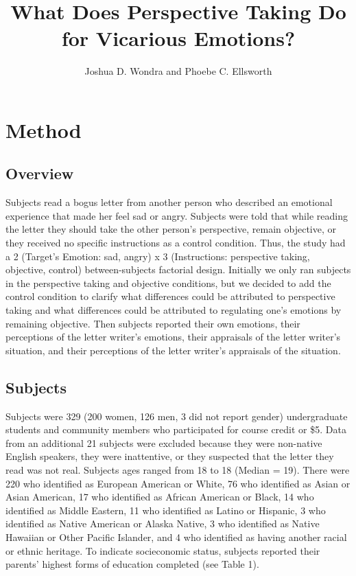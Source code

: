 \documentclass[man,a4paper,noextraspace,apacite]{apa6}\usepackage[]{graphicx}\usepackage[]{color}
\title{What Does Perspective Taking Do for Vicarious Emotions?}
\author{Joshua D. Wondra and Phoebe C. Ellsworth}
\affiliation{University of Michigan}
\begin{document}
\maketitle

\section{Method}



\subsection{Overview}

    Subjects read a bogus letter from another person who described an emotional experience that made her feel sad or angry. Subjects were told that while reading the letter they should take the other person's perspective, remain objective, or they received no specific instructions as a control condition. Thus, the study had a 2 (Target's Emotion: sad, angry) x 3 (Instructions: perspective taking, objective, control) between-subjects factorial design. Initially we only ran subjects in the perspective taking and objective conditions, but we decided to add the control condition to clarify what differences could be attributed to perspective taking and what differences could be attributed to regulating one's emotions by remaining objective. Then subjects reported their own emotions, their perceptions of the letter writer's emotions, their appraisals of the letter writer's situation, and their perceptions of the letter writer's appraisals of the situation.
    
\subsection{Subjects}

    Subjects were 329 (200 women, 126 men, 3 did not report gender) undergraduate students and community members who participated for course credit or \$5. Data from an additional 21 subjects were excluded because they were non-native English speakers, they were inattentive, or they suspected that the letter they read was not real. Subjects ages ranged from 18 to 18 (Median = 19). There were 220 who identified as European American or White, 76 who identified as Asian or Asian American, 17 who identified as African American or Black, 14 who identified as Middle Eastern, 11 who identified as Latino or Hispanic, 3 who identified as Native American or Alaska Native, 3 who identified as Native Hawaiian or Other Pacific Islander, and 4 who identified as having another racial or ethnic heritage. To indicate socieconomic status, subjects reported their parents' highest forms of education completed (see Table 1).
    
\end{document}
